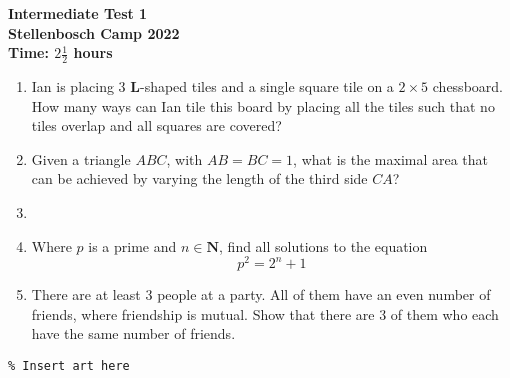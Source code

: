 \documentclass{article}
\begin{document}
\thispagestyle{empty}

\begin{center}
  \textbf{\Large Intermediate Test 1}
  \\ \vspace{1em}
  \textbf{\large Stellenbosch Camp 2022}
  \\ \vspace{1em}
  \textbf{\large Time: $2\frac{1}{2}$ hours}
\end{center}

\bigskip

\begin{enumerate}[itemsep=\fill]

\item %
Ian is placing $3$ $\mathbf{L}$-shaped tiles and a single square tile on a $2\times5$ chessboard. How many ways can Ian tile this board by placing all the tiles such that no tiles overlap and all squares are covered?


\item %

Given a triangle $ABC$, with $AB = BC = 1$, what is the maximal area that can be achieved by varying the length of the third side $CA$?

\item %


\item %
Where $p$ is a prime and $n\in\mathbf{N}$, find all solutions to the equation \[p^2 = 2^n + 1\]

\item %
There are at least 3 people at a party. All of them have an even number of friends, where friendship is mutual. Show that there are 3 of them who each have the same number of friends.

\end{enumerate}


\centering
\small
\begin{BVerbatim}
\end{BVerbatim}
\end{document}
